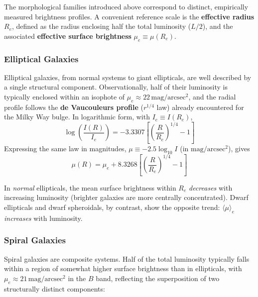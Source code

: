 The morphological families introduced above correspond to distinct, empirically measured brightness profiles. A convenient reference scale is the \textbf{effective radius} $R_e$, defined as the radius enclosing half the total luminosity ($L/2$), and the associated \textbf{effective surface brightness} $\mu_e \equiv \mu(R_e)$.

\subsubsection{Elliptical Galaxies}

Elliptical galaxies, from normal systems to giant ellipticals, are well described by a single structural component. Observationally, half of their luminosity is typically enclosed within an isophote of $\mu_e \approx 22\,\mathrm{mag/arcsec^2}$, and the radial profile follows the \textbf{de Vaucouleurs profile} ($r^{1/4}$ law) already encountered for the Milky Way bulge. In logarithmic form, with $I_e \equiv I(R_e)$,
$$
\log\left(\frac{I(R)}{I_e}\right) = -3.3307\left[\left(\frac{R}{R_e}\right)^{1/4} - 1\right]
$$
Expressing the same law in magnitudes, $\mu \equiv -2.5\log_{10} I$ (in $\mathrm{mag/arcsec^2}$), gives
$$
\mu(R) = \mu_e + 8.3268\left[\left(\frac{R}{R_e}\right)^{1/4} - 1\right]
$$

\begin{observationblock}
In \textit{normal} ellipticals, the mean surface brightness within $R_e$ \textit{decreases} with increasing luminosity (brighter galaxies are more centrally concentrated). Dwarf ellipticals and dwarf spheroidals, by contrast, show the opposite trend: $\langle\mu\rangle_e$ \textit{increases} with luminosity.
\end{observationblock}

\subsubsection{Spiral Galaxies}

Spiral galaxies are composite systems. Half of the total luminosity typically falls within a region of somewhat higher surface brightness than in ellipticals, with $\mu_e \approx 21\,\mathrm{mag/arcsec^2}$ in the $B$ band, reflecting the superposition of two structurally distinct components:

